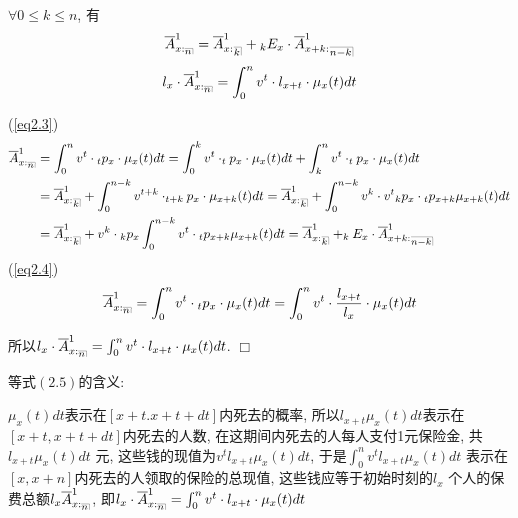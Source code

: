 \documentclass[a4paper,10pt]{ctexbook}
\makeatletter
\def\qed{\hfill$\Box$\medskip}
\DeclareRobustCommand{\annu}[1]{_{%
    \def\arraystretch{0}%
    \setlength\arraycolsep{1pt}%
    \setlength\arrayrulewidth{.2pt}%
    \begin{array}[b]{@{}c|}\hline
        \\[\arraycolsep]%
        \scriptstyle #1%
    \end{array}%
}}
\makeatother
\begin{document}
\begin{proposition}
    $\forall 0\leqslant k\leqslant n$, 有
    \begin{align}\label{eq2.3}
        \overline{A}_{x:\annu{n}}^1=\overline{A}_{x:}^1{}_{\annu k}+{}_kE_x\cdot\overline{A}_{x+k:}^1{}_{\annu {n-k}}
    \end{align}
    \begin{align}\label{eq2.4}
        l_x\cdot\overline{A}_{x:\annu{n}}^1=\int_0^{n}{v^{t}\cdot l_{x+t}\cdot \mu_{x}(t)dt}
    \end{align}
\end{proposition}


\proof
(\ref{eq2.3})
\begin{align*}
    \overline{A}_{x:\annu{n}}^1 & =\int_0^{n}{v^{t}\cdot{}_tp_x\cdot \mu_{x}(t)dt} = \int_0^{k}{v^{t}\cdot  _tp_x\cdot \mu_{x}(t)dt} +\int_k^{n}{v^{t}\cdot  _tp_x\cdot \mu_{x}(t)dt}                                                     \\
                                & = \overline{A}_{x:}^1{}_{\annu k} +\int_0^{n-k}{v^{t+k}\cdot  _{t+k}p_x\cdot \mu_{x+k}(t)dt}= \overline{A}_{x:}^1{}_{\annu k} +\int_0^{n-k}{v^{k}\cdot v^{t} {}_{k}p_x\cdot{}_{t}p_{x+k}\mu_{x+k}(t)dt} \\
                                & =\overline{A}_{x:}^1{}_{\annu k} +v^{k}\cdot {}_{k}p_x\int_0^{n-k}{ v^{t} \cdot{}_{t}p_{x+k}\mu_{x+k}(t)dt}=\overline{A}_{x:}^1{}_{\annu k}+_kE_x\cdot\overline{A}_{x+k:}^1{}_{\annu{n-k}}              \\
\end{align*}
(\ref{eq2.4})
$$\overline{A}_{x:\annu{n}}^1=\int_0^{n}{v^{t}\cdot{}_tp_x\cdot \mu_{x}(t)dt}=\int_0^{n}{v^{t}\cdot \frac{l_{x+t}}{l_x}\cdot \mu_{x}(t)dt}$$

所以$l_x\cdot\overline{A}_{x:\annu{n}}^1=\int_0^{n}{v^{t}\cdot l_{x+t}\cdot \mu_{x}(t)dt}$.
\qed
\begin{remark}等式$(2.5)$的含义:

    $\mu_x(t)dt$表示在$[x+t.x+t+dt]$内死去的概率, 所以$l_{x+t}\mu_x(t)dt$表示在$[x+t,x+t+dt]$内死去的人数, 在这期间内死去的人每人支付1元保险金, 共$l_{x+t}\mu_x(t)dt$ 元, 这些钱的现值为$v^t l_{x+t}\mu_x(t)dt$, 于是$\int_0^n{v^t l_{x+t}\mu_x(t)dt}$ 表示在$[x,x+n]$内死去的人领取的保险的总现值, 这些钱应等于初始时刻的$l_x$ 个人的保费总额$l_x\overline{A}_{x:\annu{n}}^1$, 即$l_x\cdot\overline{A}_{x:\annu{n}}^1=\int_0^{n}{v^{t}\cdot l_{x+t}\cdot \mu_{x}(t)dt}$

\end{remark}
\end{document}
